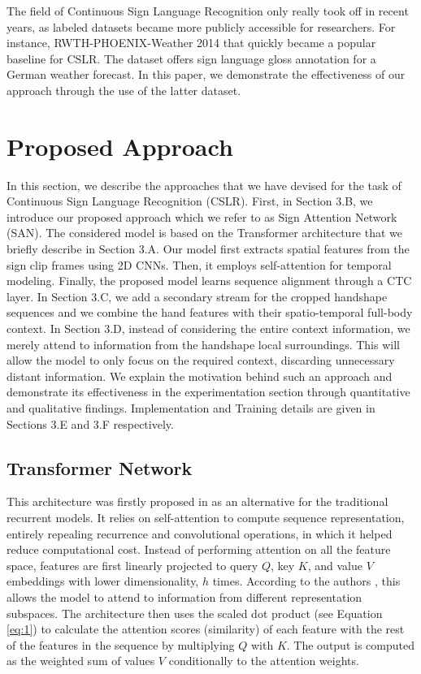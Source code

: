 \documentclass[a4paper,conference]{IEEEtran}
\begin{document}
The field of Continuous Sign Language Recognition only really took off in recent years, as labeled datasets became more publicly accessible for researchers. For instance, RWTH-PHOENIX-Weather 2014 \cite{koller2015continuous} that quickly became a popular baseline for CSLR. The dataset offers sign language gloss annotation for a German weather forecast. In this paper, we demonstrate the effectiveness of our approach through the use of the latter dataset.	


	
\section{Proposed Approach}

In this section, we describe the approaches that we have devised for the task of Continuous Sign Language Recognition (CSLR). First, in Section 3.B, we introduce our proposed approach which we refer to as Sign Attention Network (SAN). The considered model is based on the Transformer architecture that we briefly describe in Section 3.A. Our model first extracts spatial features from the sign clip frames using 2D CNNs. Then, it employs self-attention for temporal modeling. Finally, the proposed model learns sequence alignment through a CTC layer. In Section 3.C, we add a secondary stream for the cropped handshape sequences and we combine the hand features with their spatio-temporal full-body context. In Section 3.D, instead of considering the entire context information, we merely attend to information from the handshape local surroundings. This will allow the model to only focus on the required context, discarding unnecessary distant information. We explain the motivation behind such an approach and demonstrate its effectiveness in the experimentation section through quantitative and qualitative findings. Implementation and Training details are given in Sections 3.E and 3.F respectively.


\subsection{Transformer Network}
	
This architecture was firstly proposed in \cite{vaswani2017attention} as an alternative for the traditional recurrent models. It relies on self-attention to compute sequence representation, entirely repealing recurrence and convolutional operations, in which it helped reduce computational cost. Instead of performing attention on all the feature space, features are first linearly projected to query $Q$, key $K$, and value $V$ embeddings with lower dimensionality, $h$ times. According to the authors \cite{vaswani2017attention}, this allows the model to attend to information from different representation subspaces. The architecture then uses the scaled dot product (see Equation \ref{eq:1}) to calculate the attention scores (similarity) of each feature with the rest of the features in the sequence by multiplying $Q$ with $K$. The output is computed as the weighted sum of values $V$ conditionally to the attention weights. 
	
\end{document}
